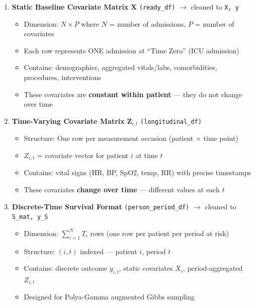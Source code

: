 \documentclass[11pt]{article}
\begin{document}
\begin{enumerate}[leftmargin=*]
    \item \textbf{Static Baseline Covariate Matrix} $\mathbf{X}$ \texttt{(ready\_df)} $\longrightarrow$ cleaned to \texttt{X, y}
    \begin{itemize}[nosep]
        \item Dimension: $N \times P$ where $N$ = number of admissions, $P$ = number of covariates
        \item Each row represents ONE admission at ``Time Zero'' (ICU admission)
        \item Contains: demographics, aggregated vitals/labs, comorbidities, procedures, interventions
        \item These covariates are \textbf{constant within patient} --- they do not change over time
    \end{itemize}

    \item \textbf{Time-Varying Covariate Matrix} $\mathbf{Z}_{i,t}$ \texttt{(longitudinal\_df)}
    \begin{itemize}[nosep]
        \item Structure: One row per measurement occasion (patient $\times$ time point)
        \item $Z_{i,t}$ = covariate vector for patient $i$ at time $t$
        \item Contains: vital signs (HR, BP, SpO2, temp, RR) with precise timestamps
        \item These covariates \textbf{change over time} --- different values at each $t$
    \end{itemize}

    \item \textbf{Discrete-Time Survival Format} \texttt{(person\_period\_df)} $\longrightarrow$ cleaned to \texttt{S\_mat, y\_S}
    \begin{itemize}[nosep]
        \item Dimension: $\sum_{i=1}^{N} T_i$ rows (one row per patient per period at risk)
        \item Structure: $(i, t)$ indexed --- patient $i$, period $t$
        \item Contains: discrete outcome $y_{i,t}$, static covariates $X_i$, period-aggregated $Z_{i,t}$
        \item Designed for Polya-Gamma augmented Gibbs sampling
    \end{itemize}
\end{enumerate}
\end{document}
